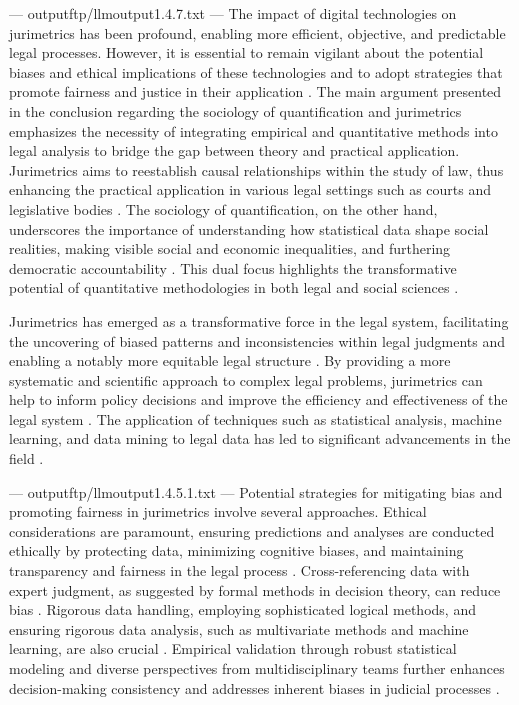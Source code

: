 ---
outputftp/llmoutput1.4.7.txt
---
The impact of digital technologies on jurimetrics has been profound, enabling more efficient, objective, and predictable legal processes. However, it is essential to remain vigilant about the potential biases and ethical implications of these technologies and to adopt strategies that promote fairness and justice in their application \cite{nunes2018,saltelli2020,demortain2019,paiva2021,camargo2021}. The main argument presented in the conclusion regarding the sociology of quantification and jurimetrics emphasizes the necessity of integrating empirical and quantitative methods into legal analysis to bridge the gap between theory and practical application. Jurimetrics aims to reestablish causal relationships within the study of law, thus enhancing the practical application in various legal settings such as courts and legislative bodies \cite{nunes2018}. The sociology of quantification, on the other hand, underscores the importance of understanding how statistical data shape social realities, making visible social and economic inequalities, and furthering democratic accountability \cite{saltelli2020,demortain2019}. This dual focus highlights the transformative potential of quantitative methodologies in both legal and social sciences \cite{paiva2021,camargo2021}.

Jurimetrics has emerged as a transformative force in the legal system, facilitating the uncovering of biased patterns and inconsistencies within legal judgments and enabling a notably more equitable legal structure \cite{10.1007/s11186-021-09453-1,10.5040/9781350220645}. By providing a more systematic and scientific approach to complex legal problems, jurimetrics can help to inform policy decisions and improve the efficiency and effectiveness of the legal system \cite{10.1007/s11186-021-09453-1,10.5040/9781350220645}. The application of techniques such as statistical analysis, machine learning, and data mining to legal data has led to significant advancements in the field \cite{10.1007/s11186-021-09453-1,10.5040/9781350220645}.


---
outputftp/llmoutput1.4.5.1.txt
---
Potential strategies for mitigating bias and promoting fairness in jurimetrics involve several approaches. Ethical considerations are paramount, ensuring predictions and analyses are conducted ethically by protecting data, minimizing cognitive biases, and maintaining transparency and fairness in the legal process \cite{silva2023}. Cross-referencing data with expert judgment, as suggested by formal methods in decision theory, can reduce bias \cite{zabala1809}. Rigorous data handling, employing sophisticated logical methods, and ensuring rigorous data analysis, such as multivariate methods and machine learning, are also crucial \cite{zabala1809, silva2023}. Empirical validation through robust statistical modeling and diverse perspectives from multidisciplinary teams further enhances decision-making consistency and addresses inherent biases in judicial processes \cite{nunes2018}.

